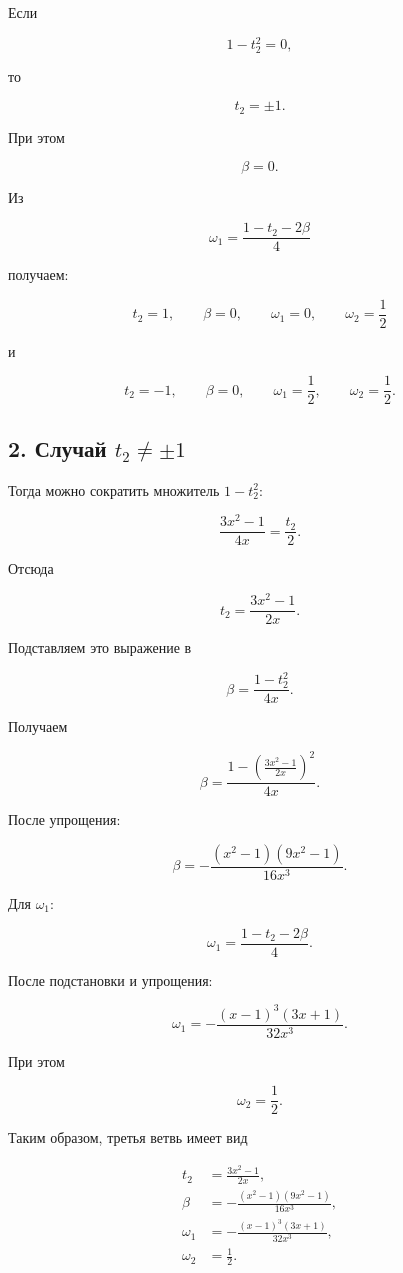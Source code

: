 \documentclass[12pt,a4paper]{article}
\begin{document}
	Если
	
	$$
	1-t_2^2=0,
	$$
	
	то
	
	$$
	t_2=\pm1.
	$$
	
	При этом
	
	$$
	\beta=0.
	$$
	
	Из
	
	$$
	\omega_1=\frac{1-t_2-2\beta}{4}
	$$
	
	получаем:
	
	$$
	\boxed{
		t_2=1,\qquad
		\beta=0,\qquad
		\omega_1=0,\qquad
		\omega_2=\frac12
	}
	$$
	
	и
	
	$$
	\boxed{
		t_2=-1,\qquad
		\beta=0,\qquad
		\omega_1=\frac12,\qquad
		\omega_2=\frac12
	}.
	$$
	
	\subsection*{2. Случай \(t_2\neq\pm1\)}
	
	Тогда можно сократить множитель \(1-t_2^2\):
	
	$$
	\frac{3x^2-1}{4x}
	=
	\frac{t_2}{2}.
	$$
	
	Отсюда
	
	$$
	\boxed{
		t_2=\frac{3x^2-1}{2x}
	}.
	$$
	
	Подставляем это выражение в
	
	$$
	\beta=\frac{1-t_2^2}{4x}.
	$$
	
	Получаем
	
	$$
	\beta
	=
	\frac{
		1-\left(\frac{3x^2-1}{2x}\right)^2
	}{4x}.
	$$
	
	После упрощения:
	
	$$
	\boxed{
		\beta
		=
		-\frac{(x^2-1)(9x^2-1)}{16x^3}
	}.
	$$
	
	Для \(\omega_1\):
	
	$$
	\omega_1
	=
	\frac{1-t_2-2\beta}{4}.
	$$
	
	После подстановки и упрощения:
	
	$$
	\boxed{
		\omega_1
		=
		-\frac{(x-1)^3(3x+1)}{32x^3}
	}.
	$$
	
	При этом
	
	$$
	\boxed{\omega_2=\frac12}.
	$$
	
	Таким образом, третья ветвь имеет вид
	
	$$
	\boxed{
		\begin{aligned}
			t_2&=\frac{3x^2-1}{2x},\\
			\beta&=-\frac{(x^2-1)(9x^2-1)}{16x^3},\\
			\omega_1&=-\frac{(x-1)^3(3x+1)}{32x^3},\\
			\omega_2&=\frac12.
		\end{aligned}
	}
	$$
	
\end{document}
